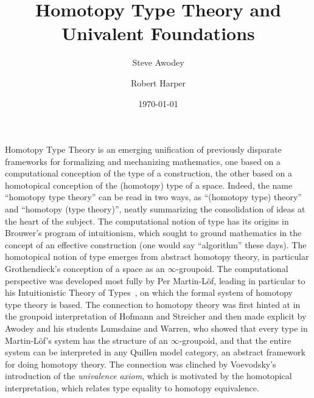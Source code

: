 \documentclass[11pt]{article}
\theoremstyle{remark}
\theoremstyle{definition}
\begin{document}

\title{Homotopy Type Theory and Univalent Foundations}
\author{Steve Awodey \and Robert Harper}
\date{\today}

\maketitle

Homotopy Type Theory is an emerging unification of previously disparate frameworks for formalizing and mechanizing
mathematics, one based on a computational conception of the type of a construction, the other based on a homotopical
conception of the (homotopy) type of a space.  Indeed, the name ``homotopy type theory'' can be read in two ways, as
``(homotopy type) theory'' and ``homotopy (type theory)'', neatly summarizing the consolidation of ideas at the heart of
the subject.  The computational notion of type has its origins in Brouwer's program of intuitionism, which sought to
ground mathematics in the concept of an effective construction (one would say ``algorithm'' these days).  The
homotopical notion of type emerges from abstract homotopy theory, in particular Grothendieck's conception of a space as
an $\infty$-groupoid.  The computational perspective was developed most fully by Per Martin-L\"{o}f, leading in
particular to his Intuitionistic Theory of Types~\cite{mltt}, on which the formal system of homotopy type theory is
based.  The connection to homotopy theory was first hinted at in the groupoid interpretation of Hofmann and Streicher
and then made explicit by Awodey and his students Lumsdaine and Warren, who showed that every type in Martin-L\"{o}f's
system has the structure of an $\infty$-groupoid, and that the entire system can be interpreted in any Quillen model
category, an abstract framework for doing homotopy theory.  The connection was clinched by Voevodsky's introduction of
the \emph{univalence axiom}, which is motivated by the homotopical interpretation, which relates type equality to
homotopy equivalence.
\end{document}
